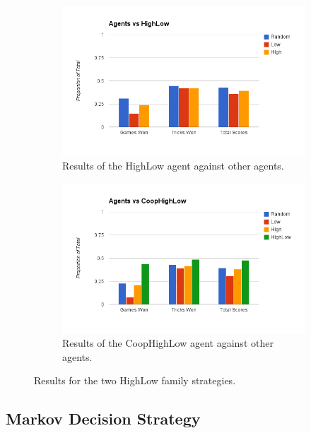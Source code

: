 \begin{figure}[ht]
    \begin{subfigure}[b]{0.5\textwidth}
        \centering
        \includegraphics[width=\textwidth]{data/highlow.png}
        \caption{Results of the HighLow agent against other agents.}
        \label{fig:results_highlow}
    \end{subfigure}
    \begin{subfigure}[b]{0.5\textwidth}
        \centering
        \includegraphics[width=\textwidth]{data/coophighlow.png}
        \caption{Results of the CoopHighLow agent against other agents.}
        \label{fig:results_coophighlow}
    \end{subfigure}
    \caption{Results for the two HighLow family strategies.}
\end{figure}


\subsection{Markov Decision Strategy}

